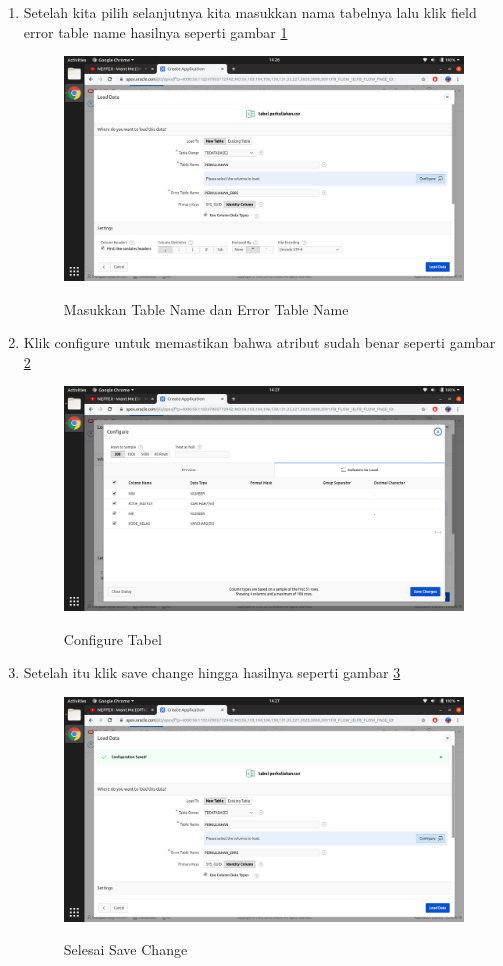 \begin{enumerate}
\item Setelah kita pilih selanjutnya kita masukkan nama tabelnya lalu klik field error table name hasilnya seperti gambar \ref{5}
\begin{figure}[H]
\centering
\caption{Masukkan Table Name dan Error Table Name}
\includegraphics[width=1\textwidth]{figures/5}
\label{5}
\end{figure}

\item Klik configure untuk memastikan bahwa atribut sudah benar seperti gambar \ref{6}
\begin{figure}[H]
\centering
\caption{Configure Tabel}
\includegraphics[width=1\textwidth]{figures/6}
\label{6}
\end{figure}

\item Setelah itu klik save change hingga hasilnya seperti gambar \ref{7}
\begin{figure}[H]
\centering
\caption{Selesai Save Change}
\includegraphics[width=1\textwidth]{figures/7}
\label{7}
\end{figure}


\end{enumerate}

